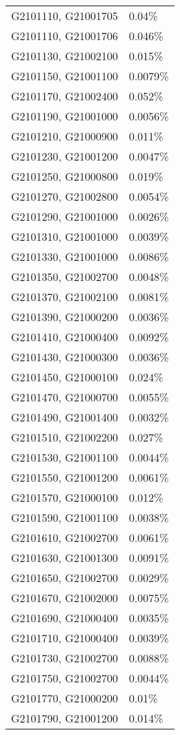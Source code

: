 \begin{longtable}[]{@{}ll@{}}
G2101110, G21001705 & 0.04\% \\
G2101110, G21001706 & 0.046\% \\
G2101130, G21002100 & 0.015\% \\
G2101150, G21001100 & 0.0079\% \\
G2101170, G21002400 & 0.052\% \\
G2101190, G21001000 & 0.0056\% \\
G2101210, G21000900 & 0.011\% \\
G2101230, G21001200 & 0.0047\% \\
G2101250, G21000800 & 0.019\% \\
G2101270, G21002800 & 0.0054\% \\
G2101290, G21001000 & 0.0026\% \\
G2101310, G21001000 & 0.0039\% \\
G2101330, G21001000 & 0.0086\% \\
G2101350, G21002700 & 0.0048\% \\
G2101370, G21002100 & 0.0081\% \\
G2101390, G21000200 & 0.0036\% \\
G2101410, G21000400 & 0.0092\% \\
G2101430, G21000300 & 0.0036\% \\
G2101450, G21000100 & 0.024\% \\
G2101470, G21000700 & 0.0055\% \\
G2101490, G21001400 & 0.0032\% \\
G2101510, G21002200 & 0.027\% \\
G2101530, G21001100 & 0.0044\% \\
G2101550, G21001200 & 0.0061\% \\
G2101570, G21000100 & 0.012\% \\
G2101590, G21001100 & 0.0038\% \\
G2101610, G21002700 & 0.0061\% \\
G2101630, G21001300 & 0.0091\% \\
G2101650, G21002700 & 0.0029\% \\
G2101670, G21002000 & 0.0075\% \\
G2101690, G21000400 & 0.0035\% \\
G2101710, G21000400 & 0.0039\% \\
G2101730, G21002700 & 0.0088\% \\
G2101750, G21002700 & 0.0044\% \\
G2101770, G21000200 & 0.01\% \\
G2101790, G21001200 & 0.014\% \\

\end{longtable}
